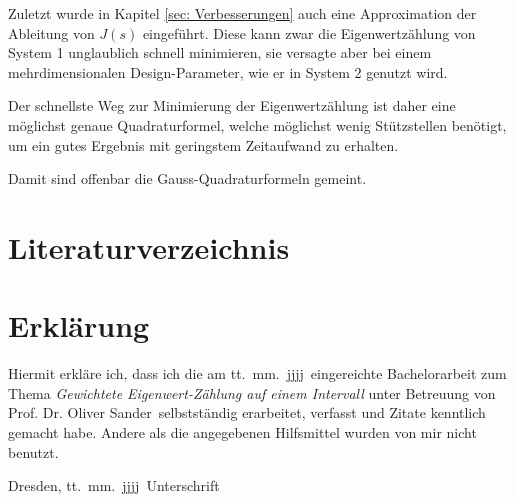 \documentclass[a4paper,12pt]{report}
\newcommand{\betreuer}{Prof. Dr. Oliver Sander}
\newcommand{\thema}{Gewichtete Eigenwert-Zählung auf einem Intervall}
\newcommand{\datum}{tt.\ mm.\ jjjj} %
\newcommand{\1}{\mathds{1}}
\theoremstyle{plain} %
\theoremstyle{definition} %
\theoremstyle{remark}
\begin{document}
      Zuletzt wurde in Kapitel \ref{sec: Verbesserungen} auch eine Approximation der Ableitung von $J(s)$ eingeführt. Diese kann zwar die Eigenwertzählung von System 1 unglaublich schnell minimieren, sie versagte aber bei einem mehrdimensionalen Design-Parameter, wie er in System 2 genutzt wird.

      Der schnellste Weg zur Minimierung der Eigenwertzählung ist daher eine möglichst genaue Quadraturformel, welche möglichst wenig Stützstellen benötigt, um ein gutes Ergebnis mit geringstem Zeitaufwand zu erhalten.

      Damit sind offenbar die Gauss-Quadraturformeln gemeint.

\chapter{Literaturverzeichnis}

      \printbibliography

\chapter*{Erkl\"{a}rung}
\thispagestyle{empty}
Hiermit erkl\"{a}re ich, dass ich die am \datum\ eingereichte Bachelorarbeit zum Thema
\emph{\thema} unter Betreuung von \betreuer\ selbstst\"{a}ndig erarbeitet,
verfasst und Zitate kenntlich gemacht habe. Andere als die angegebenen Hilfsmittel
wurden von mir nicht benutzt.

\bigskip \bigskip \bigskip \bigskip \bigskip

Dresden, \datum\ \hfill Unterschrift

\normalsize
\end{document}
